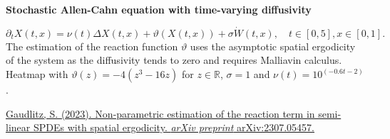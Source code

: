 {\myfontsize
\begin{center}
\textbf{Stochastic Allen-Cahn equation with time-varying diffusivity}
\end{center}
\begin{equation*}
\partial_t{X}(t, x) = \nu(t) \Delta X(t, x) + \vartheta(X(t, x))+ \sigma \dot{W}(t, x), \quad t \in [0,5], x \in [0,1].
\end{equation*}
The estimation of the reaction function $\vartheta$ uses the asymptotic spatial ergodicity of the system as the diffusivity tends to zero and requires Malliavin calculus. Heatmap with $\vartheta(z) = -4(z^3-16z)$ for $z\in\mathbb{R}$, $\sigma = 1$ and $\nu(t) = 10^{(-0.6t-2)}$.  \\ \par}
{\fontsize{12}{4}\selectfont
\href{https://arxiv.org/abs/2307.05457}{Gaudlitz, S. (2023). Non-parametric estimation of the reaction term in semi-linear SPDEs with spatial ergodicity. \textit{arXiv preprint} arXiv:2307.05457.} 
\par}
